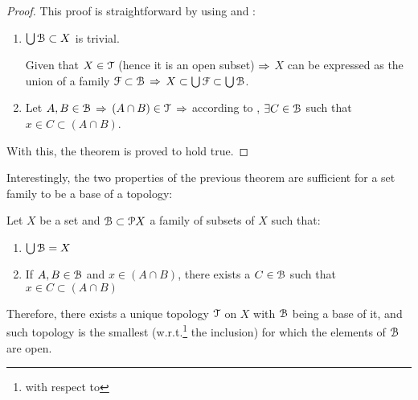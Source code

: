 \documentclass[12pt,spanish]{memoir}
\begin{document}
\begin{proof} 
This proof is straightforward by using  and :
\begin{enumerate}
\item \noindent{$\boxed{\Rightarrow}$}  $\bigcup\EuScript{B} \subset X$ is trivial.

\noindent{$\boxed{\Leftarrow}$} Given that $X\in \EuScript{T}$ (hence it is an open subset) $\Rightarrow$ $X$ can be expressed as the union of a family $\EuScript{F}\subset \EuScript{B}$ $\Rightarrow$ $X \subset \bigcup \EuScript{F}\subset \bigcup \EuScript{B}$.

\item Let $A, B\in \EuScript{B}$ $\Rightarrow$ $(A\cap B)\in \EuScript{T}$ $\Rightarrow$ according to , $\exists C\in \EuScript{B}$ such that $x\in C\subset(A\cap B)$.
\end{enumerate}
With this, the theorem is proved to hold true. 
\end{proof}

Interestingly, the two properties of the previous theorem are sufficient for a set family to be a base of a topology:

\begin{theorem}
Let $X$ be a set and $\EuScript{B}\subset \EuScript{P} X$ a family of subsets of $X$ such that:
\begin{enumerate}
\item $\bigcup \EuScript{B} = X$
\item If $A, B\in \EuScript{B}$ and $x\in (A\cap B)$, there exists a $C\in \EuScript{B}$ such that $x\in C\subset (A\cap B)$
\end{enumerate}
Therefore, there exists a unique topology $\EuScript{T}$ on $X$ with $\EuScript{B}$ being a base of it, and such topology is the smallest (w.r.t.\footnote{with respect to} the inclusion) for which the elements of $\EuScript{B}$ are open.
\label{th:1-3}
\end{theorem}
\end{document}
